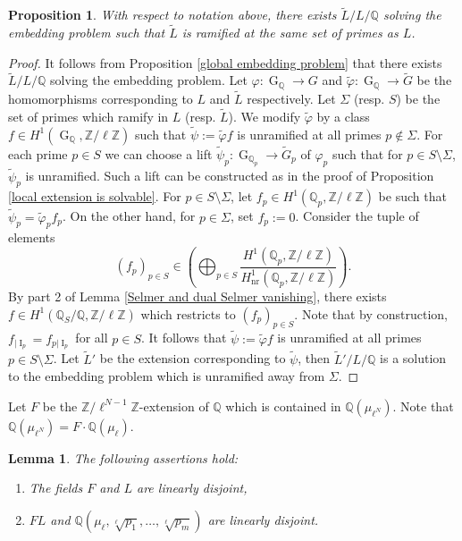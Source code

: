 \documentclass[11pt,reqno]{amsart}
\newtheorem{lemma}[theorem]{Lemma}
\newtheorem{proposition}[theorem]{Proposition}
\newcommand{\Z}{\mathbb{Z}}
\newcommand{\Q}{\mathbb{Q}}
\newcommand{\op}[1]{\operatorname{#1}}
\numberwithin{equation}{section}
\begin{document}
\begin{proposition}\label{step 2 propn}
    With respect to notation above, there exists $\widetilde{L}/L/\Q$ solving the embedding problem such that $\widetilde{L}$ is ramified at the same set of primes as $L$.
\end{proposition}
\begin{proof}
    It follows from Proposition \ref{global embedding problem} that there exists $\widetilde{L}/L/\Q$ solving the embedding problem. Let $\varphi:\op{G}_\Q\rightarrow G$ and $\widetilde{\varphi}:\op{G}_\Q\rightarrow \widetilde{G}$ be the homomorphisms corresponding to $L$ and $\widetilde{L}$ respectively. Let $\Sigma$ (resp. $S$) be the set of primes which ramify in $L$ (resp. $\widetilde{L}$). We modify $\widetilde{\varphi}$ by a class $f\in H^1(\op{G}_{\Q}, \Z/\ell \Z)$ such that $\widetilde{\psi}:=\widetilde{\varphi}f$ is unramified at all primes $p\notin \Sigma$. For each prime $p\in S$ we can choose a lift $\widetilde{\psi}_p:\op{G}_{\Q_p}\rightarrow \widetilde{G}_p$ of $\varphi_p$ such that for $p\in S\setminus \Sigma$, $\widetilde{\psi}_p$ is unramified. Such a lift can be constructed as in the proof of Proposition \ref{local extension is solvable}. For $p\in S\setminus \Sigma$, let $f_p\in H^1(\Q_{p}, \Z/\ell\Z)$ be such that $\widetilde{\psi}_p=\widetilde{\varphi}_p f_p$. On the other hand, for $p\in \Sigma$, set $f_p:=0$. Consider the tuple of elements 
    \[(f_p)_{p\in S}\in \left(\bigoplus_{p\in S} \frac{H^1(\Q_p, \Z/\ell\Z)}{H_{\op{nr}}^1(\Q_p, \Z/\ell\Z)}\right).\] By part 2 of Lemma \ref{Selmer and dual Selmer vanishing}, there exists $f\in H^1(\Q_S/\Q, \Z/\ell\Z)$ which restricts to $(f_p)_{p\in S}$. Note that by construction, $f_{|\op{I}_p}=f_{p|\op{I}_p}$ for all $p\in S$. It follows that $\widetilde{\psi}:=\widetilde{\varphi} f$ is unramified at all primes $p\in S\setminus \Sigma$. Let $\widetilde{L}'$ be the extension corresponding to $\widetilde{\psi}$, then $\widetilde{L}'/L/\Q$ is a solution to the embedding problem which is unramified away from $\Sigma$. 
\end{proof}

Let $F$ be the $\Z/\ell^{N-1}\Z$-extension of $\Q$ which is contained in $\Q(\mu_{\ell^N})$. Note that $\Q(\mu_{\ell^N})=F\cdot \Q(\mu_\ell)$. 
\begin{lemma}\label{linear disj lemma}
The following assertions hold:
\begin{enumerate}
    \item[(i)] The fields $F$ and $L$ are linearly disjoint,
    \item[(ii)] $FL$ and $\Q(\mu_\ell, \sqrt[\ell]{p_1}, \dots, \sqrt[\ell]{p_m})$ are linearly disjoint. 
\end{enumerate}
\end{lemma}
\end{document}
